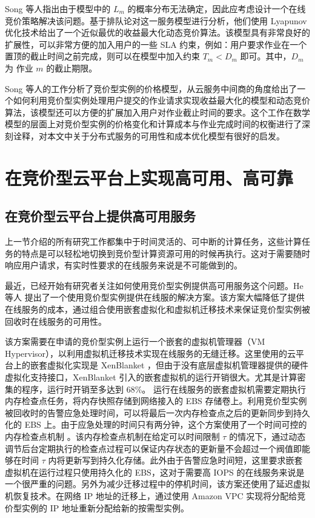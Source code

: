 Song 等人指出由于模型中的 $L_m$ 的概率分布无法确定，因此应考虑设计一个在线竞价策略解决该问题。基于排队论对这一服务模型进行分析，他们使用 Lyapunov 优化技术给出了一个近似最优的收益最大化动态竞价算法。该模型具有非常良好的扩展性，可以非常方便的加入用户的一些 SLA 约束，例如：用户要求作业在一个置顶的截止时间之前完成，则可以在模型中加入约束 $T_m < D_m$ 即可。其中，$D_m$ 为 作业 $m$ 的截止期限。

Song 等人的工作分析了竞价型实例的价格模型，从云服务中间商的角度给出了一个如何利用竞价型实例处理用户提交的作业请求实现收益最大化的模型和动态竞价算法，该模型还可以方便的扩展加入用户对作业截止时间的要求。这个工作在数学模型的层面上对竞价型实例的价格变化和计算成本与作业完成时间的权衡进行了深刻诠释，对本文中关于分布式服务的可用性和成本优化模型有很好的启发。

\section{在竞价型云平台上实现高可用、高可靠}
\subsection{在竞价型云平台上提供高可用服务}
上一节介绍的所有研究工作都集中于时间灵活的、可中断的计算任务，这些计算任务的特点是可以轻松地切换到竞价型计算资源可用的时候再执行。这对于需要随时响应用户请求，有实时性要求的在线服务来说是不可能做到的。

最近，已经开始有研究者关注如何使用竞价型实例提供高可用服务这个问题。He 等人 \cite{He:2015:CCH:2749246.2749275}  提出了一个使用竞价型实例提供在线服的解决方案。该方案大幅降低了提供在线服务的成本，通过组合使用嵌套虚拟化和虚拟机迁移技术来保证竞价型实例被回收时在线服务的可用性。

该方案需要在申请的竞价型实例上运行一个嵌套的虚拟机管理器（VM Hypervisor），以利用虚拟机迁移技术实现在线服务的无缝迁移。这里使用的云平台上的嵌套虚拟化实现是 XenBlanket \cite{Williams:2012:XVO:2168836.2168849}，但由于没有底层虚拟机管理器提供的硬件虚拟化支持接口，XenBlanket 引入的嵌套虚拟机的运行开销很大。尤其是计算密集的程序，运行时开销至多达到 68\%。 运行在线服务的嵌套虚拟机需要定期执行内存检查点任务，将内存快照存储到网络接入的 EBS 存储卷上。利用竞价型实例被回收时的告警应急处理时间，可以将最后一次内存检查点之后的更新同步到持久化的 EBS 上。由于应急处理的时间只有两分钟，这个方案使用了一个时间可控的内存检查点机制 \cite{Singh:2013:YEG:2482626.2482642}。该内存检查点机制在给定可以时间限制 $\tau$ 的情况下，通过动态调节后台定期执行的检查点过程可以保证内存状态的更新量不会超过一个阀值即能够在时间 $\tau$ 内将更新写到持久化存储。此外由于告警应急时间短，这里要求嵌套虚拟机在运行过程只使用持久化的 EBS，这对于需要高 IOPS 的在线服务来说是一个很严重的问题。另外为减少迁移过程中的停机时间，该方案还使用了延迟虚拟机恢复技术。在网络 IP 地址的迁移上，通过使用 Amazon VPC 实现将分配给竞价型实例的 IP 地址重新分配给新的按需型实例。

